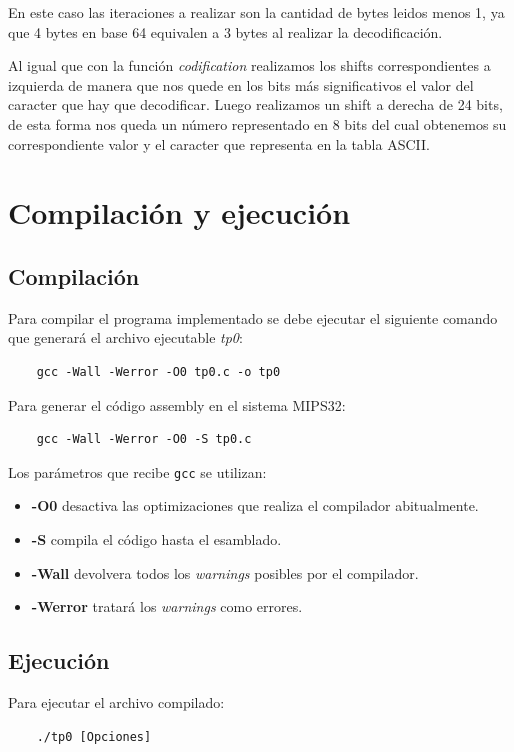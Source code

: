 \documentclass[titlepage,a4paper]{article}
\begin{document}
En este caso las iteraciones a realizar son la cantidad de bytes leidos menos 1, ya que 4 bytes en base 64 equivalen a 3 bytes al realizar la decodificación. \newline

Al igual que con la función \textit{codification} realizamos los shifts correspondientes a izquierda de manera que nos quede en los bits más significativos el valor del caracter que hay que decodificar. Luego realizamos un shift a derecha de 24 bits, de esta forma nos queda un número representado en 8 bits del cual obtenemos su correspondiente valor y el caracter que representa en la tabla ASCII. 

\section{Compilación y ejecución}

\subsection{Compilación}
Para compilar el programa implementado se debe ejecutar el siguiente comando que generará el archivo ejecutable \textit{tp0}:
\begin{verbatim}
    gcc -Wall -Werror -O0 tp0.c -o tp0
\end{verbatim}

Para generar el código assembly en el sistema MIPS32:
\begin{verbatim}
    gcc -Wall -Werror -O0 -S tp0.c
\end{verbatim}

Los parámetros que recibe \verb|gcc|  \cite{gcc_parameters} se utilizan:
\begin{itemize}
    \item \textbf{-O0} desactiva las optimizaciones que realiza el compilador abitualmente.
    
    \item \textbf{-S} compila el código hasta el esamblado.
    \item \textbf{-Wall} devolvera todos los \textit{warnings} posibles por el compilador.
    \item \textbf{-Werror} tratará los \textit{warnings} como errores.
\end{itemize}

\subsection{Ejecución}
Para ejecutar el archivo compilado:
\begin{verbatim}
    ./tp0 [Opciones]
\end{verbatim}
\end{document}
